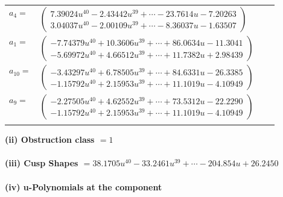 \documentclass[1p]{elsarticle_modified}
\theoremstyle{definition}
\begin{document}
\begin{tabular}{m{7pt} m{180pt} m{7pt} m{180pt} }
\flushright $a_{4}=$&$\begin{pmatrix}7.39024 u^{40}-2.43442 u^{39}+\cdots-23.7614 u-7.20263\\3.04037 u^{40}-2.00109 u^{39}+\cdots-8.36037 u-1.63507\end{pmatrix}$ \\
\flushright $a_{1}=$&$\begin{pmatrix}-7.74379 u^{40}+10.3606 u^{39}+\cdots+86.0634 u-11.3041\\-5.69972 u^{40}+4.66512 u^{39}+\cdots+11.7382 u+2.98439\end{pmatrix}$ \\
\flushright $a_{10}=$&$\begin{pmatrix}-3.43297 u^{40}+6.78505 u^{39}+\cdots+84.6331 u-26.3385\\-1.15792 u^{40}+2.15953 u^{39}+\cdots+11.1019 u-4.10949\end{pmatrix}$ \\
\flushright $a_{9}=$&$\begin{pmatrix}-2.27505 u^{40}+4.62552 u^{39}+\cdots+73.5312 u-22.2290\\-1.15792 u^{40}+2.15953 u^{39}+\cdots+11.1019 u-4.10949\end{pmatrix}$\\&\end{tabular}
\flushleft \textbf{(ii) Obstruction class $= 1$}\\~\\
\flushleft \textbf{(iii) Cusp Shapes $= 38.1705 u^{40}-33.2461 u^{39}+\cdots-204.854 u+26.2450$}\\~\\
\newpage\renewcommand{\arraystretch}{1}
\flushleft \textbf{(iv) u-Polynomials at the component}\newline \\
\end{document}
